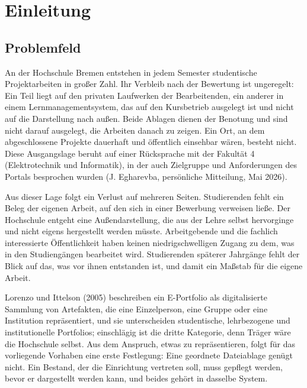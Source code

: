 
\chapter{Einleitung}
\label{kap:einleitung}

\section{Problemfeld}
\label{sec:problemfeld}

An der Hochschule Bremen entstehen in jedem Semester studentische Projektarbeiten in großer Zahl. Ihr Verbleib nach der Bewertung ist ungeregelt: Ein Teil liegt auf den privaten Laufwerken der Bearbeitenden, ein anderer in einem Lernmanagementsystem, das auf den Kursbetrieb ausgelegt ist und nicht auf die Darstellung nach außen. Beide Ablagen dienen der Benotung und sind nicht darauf ausgelegt, die Arbeiten danach zu zeigen. Ein Ort, an dem abgeschlossene Projekte dauerhaft und öffentlich einsehbar wären, besteht nicht. Diese Ausgangslage beruht auf einer Rücksprache mit der Fakultät 4 (Elektrotechnik und Informatik), in der auch Zielgruppe und Anforderungen des Portals besprochen wurden (J. Egharevba, persönliche Mitteilung, Mai 2026).

Aus dieser Lage folgt ein Verlust auf mehreren Seiten. Studierenden fehlt ein Beleg der eigenen Arbeit, auf den sich in einer Bewerbung verweisen ließe. Der Hochschule entgeht eine Außendarstellung, die aus der Lehre selbst hervorginge und nicht eigens hergestellt werden müsste. Arbeitgebende und die fachlich interessierte Öffentlichkeit haben keinen niedrigschwelligen Zugang zu dem, was in den Studiengängen bearbeitet wird. Studierenden späterer Jahrgänge fehlt der Blick auf das, was vor ihnen entstanden ist, und damit ein Maßstab für die eigene Arbeit.

Lorenzo und Ittelson (2005) beschreiben ein E-Portfolio als digitalisierte Sammlung von Artefakten, die eine Einzelperson, eine Gruppe oder eine Institution repräsentiert, und sie unterscheiden studentische, lehrbezogene und institutionelle Portfolios; einschlägig ist die dritte Kategorie, denn Träger wäre die Hochschule selbst. Aus dem Anspruch, etwas zu repräsentieren, folgt für das vorliegende Vorhaben eine erste Festlegung: Eine geordnete Dateiablage genügt nicht. Ein Bestand, der die Einrichtung vertreten soll, muss gepflegt werden, bevor er dargestellt werden kann, und beides gehört in dasselbe System.

